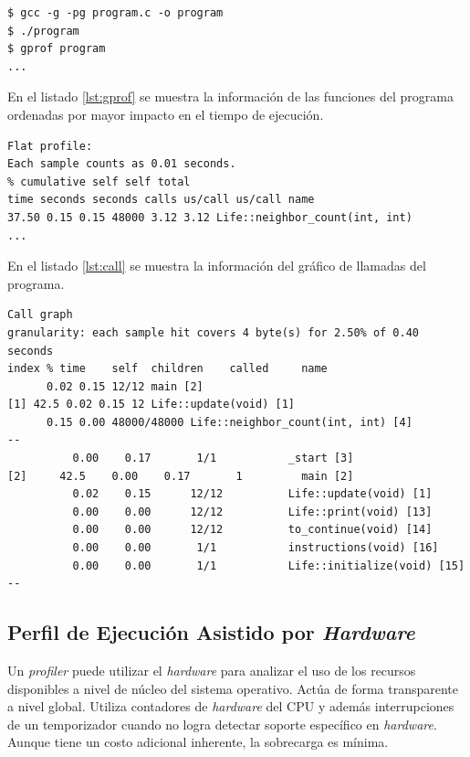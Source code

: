 \documentclass[a4paper]{report}
\begin{document}
\begin{lstlisting}[caption={Compilación con Información de Depuración},label={debug}]
$ gcc -g -pg program.c -o program
$ ./program
$ gprof program
...
\end{lstlisting}

En el listado \ref{lst:gprof} se muestra la información de las funciones del programa ordenadas por mayor impacto en el tiempo de ejecución.

\begin{lstlisting}[caption={Perfil de Rendimiento},label={lst:gprof}]
Flat profile:
Each sample counts as 0.01 seconds.
% cumulative self self total
time seconds seconds calls us/call us/call name
37.50 0.15 0.15 48000 3.12 3.12 Life::neighbor_count(int, int)
...
\end{lstlisting}

En el listado \ref{lst:call} se muestra la información del gráfico de llamadas del programa.

\begin{lstlisting}[caption={Gráficos de Llamadas},label={lst:call}]
Call graph
granularity: each sample hit covers 4 byte(s) for 2.50% of 0.40 seconds
index % time    self  children    called     name
      0.02 0.15 12/12 main [2]
[1] 42.5 0.02 0.15 12 Life::update(void) [1]
      0.15 0.00 48000/48000 Life::neighbor_count(int, int) [4]
--
          0.00    0.17       1/1           _start [3]
[2]     42.5    0.00    0.17       1         main [2]
          0.02    0.15      12/12          Life::update(void) [1]
          0.00    0.00      12/12          Life::print(void) [13]
          0.00    0.00      12/12          to_continue(void) [14]
          0.00    0.00       1/1           instructions(void) [16]
          0.00    0.00       1/1           Life::initialize(void) [15]
--
\end{lstlisting}

\subsection{Perfil de Ejecución Asistido por {\it Hardware}}

Un {\it profiler} puede utilizar el {\it hardware} para analizar el uso de los recursos disponibles a nivel de núcleo del sistema operativo. 
Actúa de forma transparente a nivel global. Utiliza contadores de {\it hardware} del CPU y además interrupciones de un temporizador
cuando no logra detectar soporte específico en {\it hardware}. Aunque tiene un costo adicional inherente, la sobrecarga es mínima.
\end{document}
